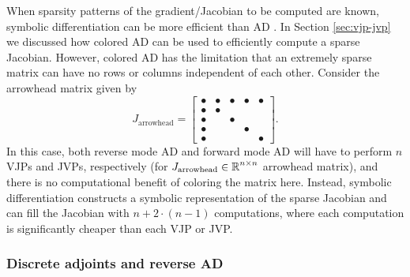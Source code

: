 When sparsity patterns of the gradient/Jacobian to be computed are known, symbolic differentiation can be more efficient than AD \cite{Lantoine_Russell_Dargent_2012}.
In Section \ref{sec:vjp-jvp} we discussed how colored AD can be used to efficiently compute a sparse Jacobian.
However, colored AD has the limitation that an extremely sparse matrix can have no rows or columns independent of each other. 
Consider the arrowhead matrix given by
\begin{equation}
    J_{\text{arrowhead}} = \begin{bmatrix}
        \bullet & \bullet & \bullet & \bullet & \bullet \\
        \bullet & \bullet &         &         &         \\
        \bullet &         & \bullet &         &         \\
        \bullet &         &         & \bullet &         \\
        \bullet &         &         &         & \bullet
    \end{bmatrix}.
\end{equation}
In this case, both reverse mode AD and forward mode AD will have to perform $n$ VJPs and JVPs, respectively (for $J_{\text{arrowhead}} \in \operatorname{\mathbb{R}}^{n \times n}$ arrowhead matrix), and there is no computational benefit of coloring the matrix here. 
Instead, symbolic differentiation constructs a symbolic representation of the sparse Jacobian and can fill the Jacobian with $n + 2 \cdot (n-1)$ computations, where each computation is significantly cheaper than each VJP or JVP. 

\subsubsection{Discrete adjoints and reverse AD}
\label{section:comparison-discrete-adjoint-AD}


